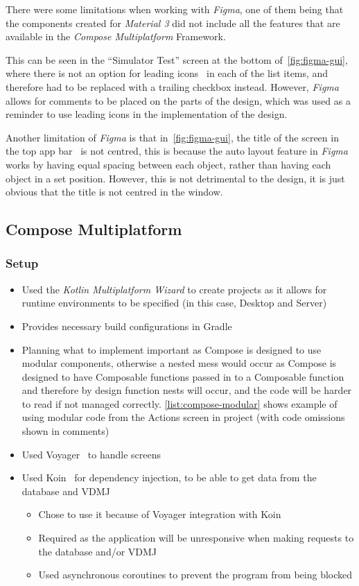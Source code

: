 \documentclass[../dissertation.tex]{subfiles}
\begin{document}
There were some limitations when working with \textit{Figma}, one of them being that
the components created for \textit{Material 3} did not include all the features that are
available in the \textit{Compose Multiplatform} Framework.

This can be seen in the \enquote{Simulator Test} screen at the bottom of~\autoref{fig:figma-gui},
where there is not an option for leading icons~\cite{material:lists} in each of the list items,
and therefore had to be replaced with a trailing checkbox instead. However, \textit{Figma}
allows for comments to be placed on the parts of the design, which was used as a reminder
to use leading icons in the implementation of the design.

Another limitation of \textit{Figma} is that in~\autoref{fig:figma-gui}, the title of the screen
in the top app bar~\cite{material:top-app-bar} is not centred, this is because
the auto layout feature in \textit{Figma} works by having equal spacing between each
object, rather than having each object in a set position. However, this is
not detrimental to the design, it is just obvious that the title is not centred in the
window.


\subsection{Compose Multiplatform}
\subsubsection{Setup}
\begin{itemize}
  \item Used the \textit{Kotlin Multiplatform Wizard} to create projects as it allows
    for runtime environments to be specified (in this case, Desktop and Server)
  \item Provides necessary build configurations in Gradle
  \item Planning what to implement important as Compose is designed to use modular
    components, otherwise a nested mess would occur as Compose is designed to have
    Composable functions passed in to a Composable function and therefore by design
    function nests will occur, and the code will be harder to read if not managed correctly.
    \autoref{list:compose-modular} shows example of using modular code
    from the Actions screen in project (with code omissions shown in comments)
  \item Used Voyager~\cite{voyager} to handle screens
  \item Used Koin~\cite{koin} for dependency injection, to be able to get data from the
    database and VDMJ
    \begin{itemize}
      \item Chose to use it because of Voyager integration with Koin~\cite{voyager:koin}
      \item Required as the application will be unresponsive when making requests
        to the database and/or VDMJ
      \item Used asynchronous coroutines to prevent the program from being blocked
    \end{itemize}
\end{itemize}
\end{document}
